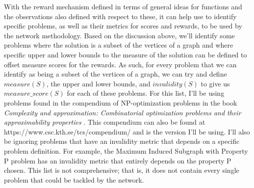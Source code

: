 \documentclass{article}
\begin{document}
With the reward mechanism defined in terms of general ideas for functions and the observations also defined with respect to these, it can help use to identify specific problems, as well as their metrics for scores and rewards, to be used by the network methodology. Based on the discussion above, we'll identify some problems where the solution is a subset of the vertices of a graph and where specific upper and lower bounds to the measure of the solution can be defined to offset measure scores for the rewards. As such, for every problem that we can identify as being a subset of the vertices of a graph, we can try and define $measure(S)$, the upper and lower bounds, and $invalidity(S)$ to give us $measure\_score(S)$ for each of these problems. For this list, I'll be using problems found in the compendium of NP-optimization problems in the book \textit{Complexity and approximation: Combinatorial optimization problems and their approximability properties} \cite{np-opt-compendium}. This compendium can also be found at https://www.csc.kth.se/tcs/compendium/ \cite{np-opt-web} and is the version I'll be using. I'll also be ignoring problems that have an invalidity metric that depends on a specific problem definition. For example, the Maximum Induced Subgraph with Property P problem has an invalidity metric that entirely depends on the property P chosen. This list is not comprehensive; that is, it does not contain every single problem that could be tackled by the network.

\clearpage
\end{document}
